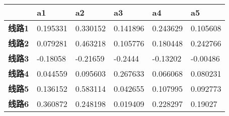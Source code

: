 \documentclass[12pt,a4paper]{ctexart}
\begin{document}
	\begin{longtable}{@{}llllll@{}}
		&
		\textbf{a1} &
		\textbf{a2} &
		\textbf{a3} &
		\textbf{a4} &
		\textbf{a5} \\* \cmidrule(l){2-6} 
		\endfirsthead
		\endhead
		\multicolumn{1}{l|}{\textbf{线路1}} &
		\multicolumn{1}{l|}{0.195331} &
		\multicolumn{1}{l|}{0.330152} &
		\multicolumn{1}{l|}{0.141896} &
		\multicolumn{1}{l|}{0.243629} &
		\multicolumn{1}{l|}{0.105608} \\* \cmidrule(l){2-6} 
		\multicolumn{1}{l|}{\textbf{线路2}} &
		\multicolumn{1}{l|}{0.079281} &
		\multicolumn{1}{l|}{0.463218} &
		\multicolumn{1}{l|}{0.105776} &
		\multicolumn{1}{l|}{0.180448} &
		\multicolumn{1}{l|}{0.242766} \\* \cmidrule(l){2-6} 
		\multicolumn{1}{l|}{\textbf{线路3}} &
		\multicolumn{1}{l|}{-0.18058} &
		\multicolumn{1}{l|}{-0.21659} &
		\multicolumn{1}{l|}{-0.2444} &
		\multicolumn{1}{l|}{-0.13202} &
		\multicolumn{1}{l|}{-0.00486} \\* \cmidrule(l){2-6} 
		\multicolumn{1}{l|}{\textbf{线路4}} &
		\multicolumn{1}{l|}{0.044559} &
		\multicolumn{1}{l|}{0.095603} &
		\multicolumn{1}{l|}{0.267633} &
		\multicolumn{1}{l|}{0.066068} &
		\multicolumn{1}{l|}{0.080231} \\* \cmidrule(l){2-6} 
		\multicolumn{1}{l|}{\textbf{线路5}} &
		\multicolumn{1}{l|}{0.136152} &
		\multicolumn{1}{l|}{0.583114} &
		\multicolumn{1}{l|}{0.042655} &
		\multicolumn{1}{l|}{0.107995} &
		\multicolumn{1}{l|}{0.092773} \\* \cmidrule(l){2-6} 
		\multicolumn{1}{l|}{\textbf{线路6}} &
		\multicolumn{1}{l|}{0.360872} &
		\multicolumn{1}{l|}{0.248198} &
		\multicolumn{1}{l|}{0.019409} &
		\multicolumn{1}{l|}{0.228297} &
		\multicolumn{1}{l|}{0.19027} \\* \cmidrule(l){2-6} 
	\end{longtable}

\newpage
\end{document}
